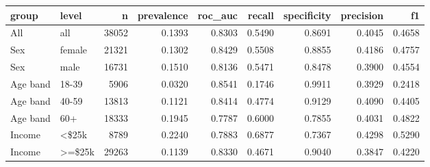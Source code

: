 \begin{tabular}{llrrrrrrr}
\toprule
group & level & n & prevalence & roc\_auc & recall & specificity & precision & f1 \\
\midrule
All & all & 38052 & 0.1393 & 0.8303 & 0.5490 & 0.8691 & 0.4045 & 0.4658 \\
Sex & female & 21321 & 0.1302 & 0.8429 & 0.5508 & 0.8855 & 0.4186 & 0.4757 \\
Sex & male & 16731 & 0.1510 & 0.8136 & 0.5471 & 0.8478 & 0.3900 & 0.4554 \\
Age band & 18-39 & 5906 & 0.0320 & 0.8541 & 0.1746 & 0.9911 & 0.3929 & 0.2418 \\
Age band & 40-59 & 13813 & 0.1121 & 0.8414 & 0.4774 & 0.9129 & 0.4090 & 0.4405 \\
Age band & 60+ & 18333 & 0.1945 & 0.7787 & 0.6000 & 0.7855 & 0.4031 & 0.4822 \\
Income & <\$25k & 8789 & 0.2240 & 0.7883 & 0.6877 & 0.7367 & 0.4298 & 0.5290 \\
Income & >=\$25k & 29263 & 0.1139 & 0.8330 & 0.4671 & 0.9040 & 0.3847 & 0.4220 \\
\bottomrule
\end{tabular}
